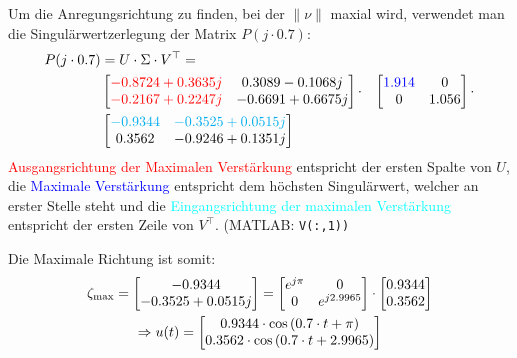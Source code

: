         Um die Anregungsrichtung zu finden, bei der $\|\nu\|$ maxial wird, verwendet man die Singulärwertzerlegung der Matrix $P(j\cdot0.7)$:
        \begin{align*}
            P(j\cdot0.7) &= U\cdot\Sigma\cdot V^\top = \\ 
           &\begin{bmatrix}
           \textcolor{red}{-0.8724+0.3635j}  &   0.3089-0.1068j\\
           \textcolor{red}{-0.2167+0.2247j}  &   -0.6691+0.6675j
           \end{bmatrix}
           \cdot
           &\begin{bmatrix}
           \textcolor{blue}{1.914}    &   0\\
           0        &   1.056
           \end{bmatrix}
           \cdot\\
           &\begin{bmatrix}
           \textcolor{cyan}{-0.9344}  &   \textcolor{cyan}{-0.3525+0.0515j}\\
           0.3562   &   -0.9246+0.1351j
           \end{bmatrix}
        \end{align*}
        \textcolor{red}{Ausgangsrichtung der Maximalen Verstärkung} entspricht der ersten Spalte von $U$, die \textcolor{blue}{Maximale Verstärkung} entspricht dem höchsten Singulärwert, welcher an erster Stelle steht und die \textcolor{cyan}{Eingangsrichtung der maximalen Verstärkung} entspricht der ersten Zeile von $V^\top$. \big(MATLAB: \texttt{V(:,1)\big)}
        
        Die Maximale Richtung ist somit:
        \begin{gather*}
            \zeta_\textnormal{max} = 
            \begin{bmatrix}
            -0.9344\\ -0.3525+0.0515j
            \end{bmatrix}
            =
            \begin{bmatrix}
            e^{j\pi} & 0\\
            0 & e^{j2.9965}
            \end{bmatrix}
            \cdot
            \begin{bmatrix}
            0.9344\\ 0.3562
            \end{bmatrix}\\
            \Rightarrow u(t) = 
            \begin{bmatrix}
            0.9344\cdot\cos\left(0.7\cdot t + \pi\right)\\
            0.3562\cdot\cos\left(0.7\cdot t + 2.9965\right)
            \end{bmatrix}
        \end{gather*}
        
